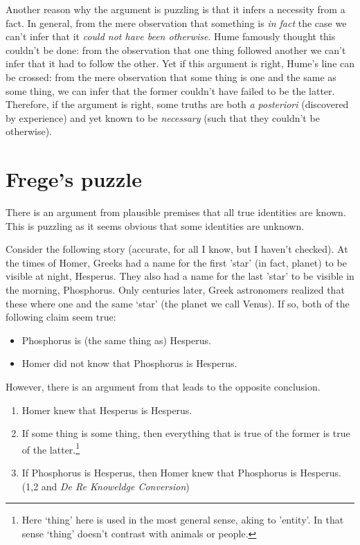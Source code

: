 \documentclass[../../../include/open-logic-chapter]{subfiles}
\begin{document}
Another reason why the argument is puzzling is that it infers a
necessity from a fact. In general, from the mere observation that
something is \emph{in fact} the case we can't infer that it
\emph{could not have been otherwise}. Hume famously thought this
couldn't be done: from the observation that one thing followed another
we can't infer that it had to follow the other. Yet if this argument
is right, Hume's line can be crossed: from the mere observation that
some thing is one and the same as some thing, we can infer that the 
former couldn't have failed to be the latter.
Therefore, if the argument is right, some truths are both \emph{a
posteriori} (discovered by  experience) and yet known to be
\emph{necessary} (such that they couldn't be otherwise). 

\section{Frege's puzzle}

There is an argument from plausible premises that all true identities
are known. This is puzzling as it seems obvious that some identities
are unknown. 

Consider the following story (accurate, for all I know, but I haven't
checked). At the times of Homer, Greeks had a name for the first
'star' (in fact, planet) to be visible at night, Hesperus. They also
had a name for the last 'star' to be visible in the morning,
Phosphorus. Only centuries later, Greek astronomers realized that
these where one and the same `star' (the planet we call Venus). If so,
both of the following claim seem true:

\begin{itemize}
    \item Phosphorus is (the same thing as) Hesperus.
    \item Homer did not know that Phosphorus is Hesperus.
\end{itemize}

However, there is an argument from that leads to the opposite
conclusion.

\begin{enumerate}
\item Homer knew that Hesperus is Hesperus. 
\item If some thing is some thing, then everything that is true of the
former is true of the latter.\footnote{Here `thing' here is used in
the most general sense, aking to 'entity'. In that sense `thing'
doesn't contrast with animals or people.}
\item If Phosphorus is Hesperus, then Homer knew that Phosphorus is Hesperus. (1,2 and \emph{De Re Knoweldge Conversion})
\end{enumerate}
\end{document}
